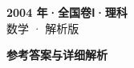 \documentclass[zihao=-4, a4paper]{ctexart}
\begin{document}
\begin{center}
  {\Large\bfseries 2004 年·全国卷Ⅰ·理科}\\[4pt]
  {\large 数学 · 解析版}
\end{center}
\medskip
{}

\clearpage
{}
\begin{center}{\Large\bfseries 参考答案与详细解析}\end{center}
\medskip

\end{document}
